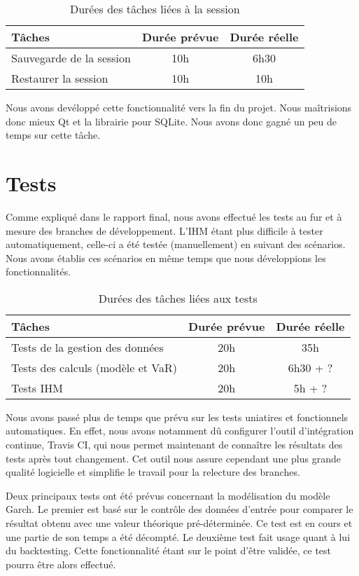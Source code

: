 \documentclass[a4paper]{report}
\begin{document}
\begin{table}[H]
\centering
  \begin{tabularx}{0.8\textwidth}{| X | c | c |}
    \hline
	Tâches & Durée prévue & Durée réelle \\
    \hline
    Sauvegarde de la session &  10h & 6h30\\
    Restaurer la session &  10h & 10h\\
    \hline
  \end{tabularx}
  \caption{Durées des tâches liées à la session}
\end{table}

Nous avons devéloppé cette fonctionnalité vers la fin du projet.
Nous maîtrisions donc mieux Qt et la librairie pour SQLite.
Nous avons donc gagné un peu de temps sur cette tâche.


\chapter{Tests}

Comme expliqué dans le rapport final, nous avons effectué les tests au fur et à mesure des branches de développement.
L'IHM étant plus difficile à tester automatiquement, celle-ci a été testée (manuellement) en suivant des scénarios.
Nous avons établis ces scénarios en même temps que nous développions les fonctionnalités.

\begin{table}[H]
\centering
  \begin{tabularx}{0.8\textwidth}{| X | c | c |}
    \hline
	Tâches & Durée prévue & Durée réelle \\
    \hline
    Tests de la gestion des données & 20h & 35h\\
    Tests des calculs (modèle et VaR) & 20h & 6h30 + ?\\
    Tests IHM & 20h & 5h + ?\\
    \hline
  \end{tabularx}
  \caption{Durées des tâches liées aux tests}
\end{table}

Nous avons passé plus de temps que prévu sur les tests uniatires et fonctionnels automatiques.
En effet, nous avons notamment dû configurer l'outil d'intégration continue, Travis CI, qui nous permet maintenant de connaître les résultats des tests après tout changement.
Cet outil nous assure cependant une plus grande qualité logicielle et simplifie le travail pour la relecture des branches.

Deux principaux tests ont été prévus concernant la modélisation du modèle Garch. Le premier est basé sur le contrôle des données d'entrée pour comparer le résultat obtenu avec une valeur théorique pré-déterminée. Ce test est en cours et une partie de son temps a été décompté. Le deuxième test fait usage quant à lui du backtesting. Cette fonctionnalité étant sur le point d'être validée, ce test pourra être alors effectué.
\end{document}
